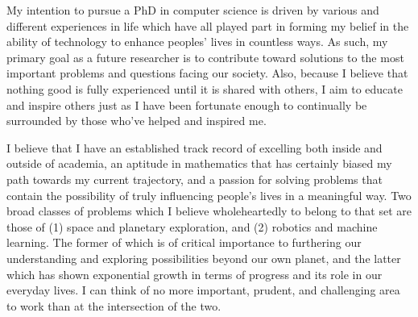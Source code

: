 
My intention to pursue a PhD in computer science is driven by various and different experiences in life which have all played part in forming my belief in the ability of technology to enhance peoples' lives in countless ways. As such, my primary goal as a future researcher is to contribute toward solutions to the most important problems and questions facing our society. Also, because I believe that nothing good is fully experienced until it is shared with others, I aim to educate and inspire others just as I have been fortunate enough to continually be surrounded by those who've helped and inspired me. 


I believe that I have an established track record of excelling both inside and outside of academia, an aptitude in mathematics that has certainly biased my path towards my current trajectory, and a passion for solving problems that contain the possibility of truly influencing people's lives in a meaningful way. Two broad classes of problems which I believe wholeheartedly to belong to that set are those of (1) space and planetary exploration, and (2) robotics and machine learning. The former of which is of critical importance to furthering our understanding and exploring possibilities beyond our own planet, and the latter which has shown exponential growth in terms of progress and its role in our everyday lives. I can think of no more important, prudent, and challenging area to work than at the intersection of the two. 

